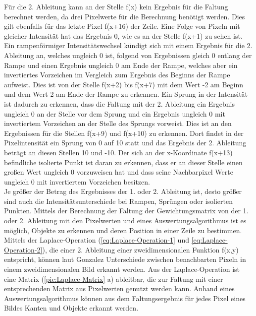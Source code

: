 \documentclass[ngerman,12pt]{article} %
\begin{document}
Für die 2. Ableitung kann an der Stelle f(x) kein Ergebnis für die Faltung berechnet werden, da drei Pixelwerte für die Berechnung benötigt werden. Dies gilt ebenfalls für das letzte Pixel f(x+16) der Zeile. Eine Folge von Pixeln mit gleicher Intensität hat das Ergebnis 0, wie es an der Stelle f(x+1) zu sehen ist. Ein rampenförmiger Intensitätswechsel kündigt sich mit einem Ergebnis für die 2. Ableitung an, welches ungleich 0 ist, folgend von Ergebnissen gleich 0 entlang der Rampe und einen Ergebnis ungleich 0 am Ende der Rampe, welches aber ein invertiertes Vorzeichen im Vergleich zum Ergebnis des Beginns der Rampe aufweist. Dies ist von der Stelle f(x+2) bis f(x+7) mit dem Wert -2 am Beginn und dem Wert 2 am Ende der Rampe zu erkennen. Ein Sprung in der Intensität ist dadurch zu erkennen, dass die Faltung mit der 2. Ableitung ein Ergebnis ungleich 0 an der Stelle vor dem Sprung und ein Ergebnis ungleich 0 mit invertiertem Vorzeichen an der Stelle des Sprungs vorweist. Dies ist an den Ergebnissen für die Stellen f(x+9) und f(x+10) zu erkennen. Dort findet in der Pixelintensität ein Sprung von 0 auf 10 statt und das Ergebnis der 2. Ableitung beträgt an diesen Stellen 10 und -10. Der sich an der x-Koordinate f(x+13) befindliche isolierte Punkt ist daran zu erkennen, dass er an dieser Stelle einen großen Wert ungleich 0 vorzuweisen hat und dass seine Nachbarpixel Werte ungleich 0 mit invertiertem Vorzeichen besitzen.\\
Je größer der Betrag des Ergebnisses der 1. oder 2. Ableitung ist, desto größer sind auch die Intensitätsunterschiede bei Rampen, Sprüngen oder isolierten Punkten. Mittels der Berechnung der Faltung der Gewichtungsmatrix von der 1. oder 2. Ableitung mit den Pixelwerten und eines Auswertungsalgorithmus ist es möglich, Objekte zu erkennen und deren Position in einer Zeile zu bestimmen.\\

Mittels der Laplace-Operation (\autoref{eq:Laplace-Operation-1} und \autoref{eq:Laplace-Operation-2}), die einer 2. Ableitung einer zweidimensionalen Funktion f(x,y) entspricht, können laut Gonzalez Unterschiede zwischen benachbarten Pixeln in einem zweidimensionalen Bild erkannt werden. Aus der Laplace-Operation ist eine Matrix (\autoref{pic:Laplace-Matrix} a) ableitbar, die zur Faltung mit einer entsprechenden Matrix aus Pixelwerten genutzt werden kann. Anhand eines Auswertungsalgorithmus können aus dem Faltungsergebnis für jedes Pixel eines Bildes Kanten und Objekte erkannt werden.\newline
\end{document}
